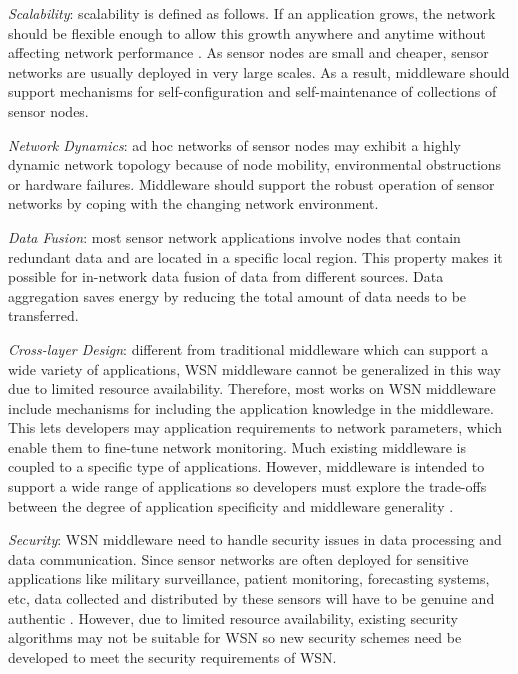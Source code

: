 \emph{Scalability}: scalability is defined as follows. If an application grows, the network should be flexible enough to allow this growth anywhere and anytime without affecting network performance \cite{middlewarechallenge}. As sensor nodes are small and cheaper, sensor networks are usually deployed in very large scales. As a result, middleware should support mechanisms for self-configuration and self-maintenance of collections of sensor nodes. 

\emph{Network Dynamics}: ad hoc networks of sensor nodes may exhibit a highly dynamic network topology because of node mobility, environmental obstructions or hardware failures. Middleware should support the robust operation of sensor networks by coping with the changing network environment. 

\emph{Data Fusion}: most sensor network applications involve nodes that contain redundant data and are located in a specific local region. This property makes it possible for in-network data fusion of data from different sources. Data aggregation saves energy by reducing the total amount of data needs to be transferred.

\emph{Cross-layer Design}: different from traditional middleware which can support a wide variety of applications, WSN middleware cannot be generalized in this way due to limited resource availability. Therefore, most works on WSN middleware include mechanisms for including the application knowledge in the middleware. This lets developers may application requirements to network parameters, which enable them to fine-tune network monitoring. Much existing middleware is coupled to a specific type of applications. However, middleware is intended to support a wide range of applications so developers must explore the trade-offs between the degree of application specificity and middleware generality \cite{middlewarechallenge}.

\emph{Security}: WSN middleware need to handle security issues in data processing and data communication. Since sensor networks are often deployed for sensitive applications like military surveillance, patient monitoring, forecasting systems, etc, data collected and distributed by these sensors will have to be genuine and authentic \cite{middlewaresurvey1}. However, due to limited resource availability, existing security algorithms may not be suitable for WSN so new security schemes need be developed to meet the security requirements of WSN.

